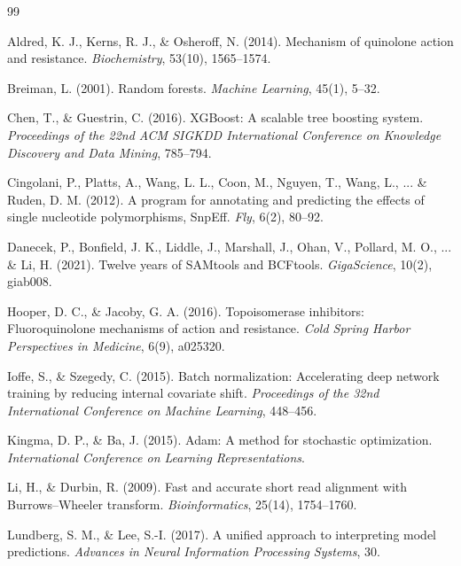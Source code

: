 \documentclass[11pt,a4paper]{article}
\begin{document}
\newpage
\begin{thebibliography}{99}

Aldred, K. J., Kerns, R. J., \& Osheroff, N. (2014).
Mechanism of quinolone action and resistance.
\textit{Biochemistry}, 53(10), 1565--1574.

Breiman, L. (2001).
Random forests.
\textit{Machine Learning}, 45(1), 5--32.

Chen, T., \& Guestrin, C. (2016).
XGBoost: A scalable tree boosting system.
\textit{Proceedings of the 22nd ACM SIGKDD International Conference on Knowledge Discovery and Data Mining}, 785--794.

Cingolani, P., Platts, A., Wang, L. L., Coon, M., Nguyen, T., Wang, L., ... \& Ruden, D. M. (2012).
A program for annotating and predicting the effects of single nucleotide polymorphisms, SnpEff.
\textit{Fly}, 6(2), 80--92.

Danecek, P., Bonfield, J. K., Liddle, J., Marshall, J., Ohan, V., Pollard, M. O., ... \& Li, H. (2021).
Twelve years of SAMtools and BCFtools.
\textit{GigaScience}, 10(2), giab008.

Hooper, D. C., \& Jacoby, G. A. (2016).
Topoisomerase inhibitors: Fluoroquinolone mechanisms of action and resistance.
\textit{Cold Spring Harbor Perspectives in Medicine}, 6(9), a025320.

Ioffe, S., \& Szegedy, C. (2015).
Batch normalization: Accelerating deep network training by reducing internal covariate shift.
\textit{Proceedings of the 32nd International Conference on Machine Learning}, 448--456.

Kingma, D. P., \& Ba, J. (2015).
Adam: A method for stochastic optimization.
\textit{International Conference on Learning Representations}.

Li, H., \& Durbin, R. (2009).
Fast and accurate short read alignment with Burrows--Wheeler transform.
\textit{Bioinformatics}, 25(14), 1754--1760.

Lundberg, S. M., \& Lee, S.-I. (2017).
A unified approach to interpreting model predictions.
\textit{Advances in Neural Information Processing Systems}, 30.


\end{thebibliography}
\end{document}
